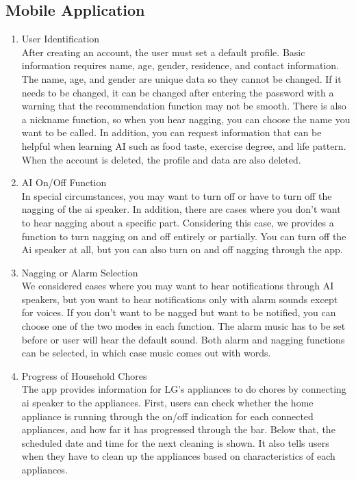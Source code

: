 \documentclass[conference]{IEEEtran}
\begin{document}
\subsection{Mobile Application}
    \begin{enumerate}
        \item User Identification\\
        After creating an account, the user must set a default profile. Basic information requires name, age, gender, residence, and contact information. The name, age, and gender are unique data so they cannot be changed. If it needs to be changed, it can be changed after entering the password with a warning that the recommendation function may not be smooth. There is also a nickname function, so when you hear nagging, you can choose the name you want to be called. In addition, you can request information that can be helpful when learning AI such as food taste, exercise degree, and life pattern. When the account is deleted, the profile and data are also deleted.\\
        
        \item AI On/Off Function\\
        In special circumstances, you may want to turn off or have to turn off the nagging of the ai speaker. In addition, there are cases where you don't want to hear nagging about a specific part. Considering this case, we provides a function to turn nagging on and off entirely or partially. You can turn off the Ai speaker at all, but you can also turn on and off nagging through the app.\\
        
        \item Nagging or Alarm Selection\\
        We considered cases where you may want to hear notifications through AI speakers, but you want to hear notifications only with alarm sounds except for voices. If you don't want to be nagged but want to be notified, you can choose one of the two modes in each function. The alarm music has to be set before or user will hear the default sound. Both alarm and nagging functions can be selected, in which case music comes out with words.\\
        
        \item Progress of Household Chores\\
        The app provides information for LG’s appliances to do chores by connecting ai speaker to the appliances. First, users can check whether the home appliance is running through the on/off indication for each connected appliances, and how far it has progressed through the bar. Below that, the scheduled date and time for the next cleaning is shown. It also tells users when they have to clean up the appliances based on characteristics of each appliances.
    \end{enumerate}
    
\end{document}
